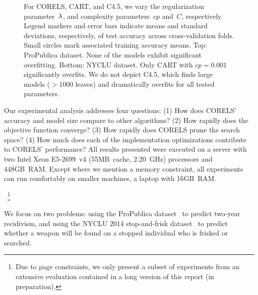 \begin{figure}[t!]
{%
For CORELS, CART, and C4.5, we vary the regularization parameter~${\lambda}$,
and complexity parameters~$cp$ and~$C$, respectively.
%
Legend markers and error bars indicate means and standard deviations,
respectively, of test accuracy across cross-validation folds.
%
Small circles mark associated training accuracy means.
%
Top:  %
ProPublica dataset.
%
None of the models exhibit significant overfitting.
%
Bottom:  %
NYCLU dataset.
%
Only CART with ${cp = 0.001}$ significantly overfits.
%
We do not depict C4.5, which finds large models (${>1000}$ leaves)
and dramatically overfits for all tested parameters.
}
\label{fig:sparsity}
\end{figure}


Our experimental analysis addresses four questions:
(1) How does CORELS' accuracy and model size compare to other algorithms?
(2) How rapidly does the objective function converge?
(3) How rapidly does CORELS prune the search space?
(4) How much does each of the implementation optimizations contribute to CORELS' performance?
%
All results presented were executed on a server with two Intel Xeon E5-2699~v4
(55MB~cache, 2.20~GHz) processors and 448GB~RAM.
%
Except where we mention a memory constraint, all experiments
can run comfortably on smaller machines, \eg a laptop with 16GB~RAM.\begin{kdd}
~\footnote{Due to page constraints, we only present a subset of experiments from
an extensive evaluation contained in a long version of this report (in preparation).}
\end{kdd}
%
We focus on two problems:
using the ProPublica dataset~\cite{LarsonMaKiAn16} to predict two-year recidivism,
and using the NYCLU 2014 stop-and-frisk dataset~\cite{nyclu:2014} to predict
whether a weapon will be found on a stopped individual who is frisked or searched.

